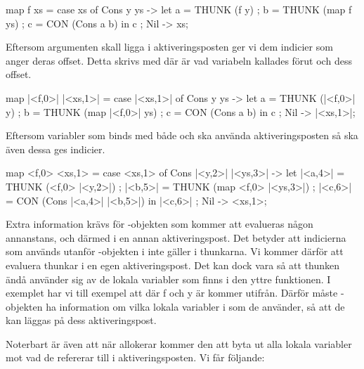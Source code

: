 \documentclass[../Core]{subfiles}
\begin{document}

\begin{codeEx}
map f xs = case xs of
    { Cons y ys -> let
        { a = THUNK (f y)
        ; b = THUNK (map f ys)
        ; c = CON (Cons a b)
        } in c
    ; Nil -> xs};
\end{codeEx}

Eftersom argumenten skall ligga i aktiveringsposten ger vi dem indicier som anger deras 
offset. Detta skrivs med  där  är vad variabeln kallades 
förut och  dess offset.

\begin{codeExDiff}
map |<f,0>| |<xs,1>| = case |<xs,1>| of
    { Cons y ys -> let
        { a = THUNK (|<f,0>| y)
        ; b = THUNK (map |<f,0>| ys)
        ; c = CON (Cons a b)
        } in c
    ; Nil -> |<xs,1>|};
\end{codeExDiff}


Eftersom variabler som binds med både  och  
ska använda aktiveringsposten så ska även dessa ges indicier.

\begin{codeExDiff}
map <f,0> <xs,1> = case <xs,1> of
    { Cons |<y,2>| |<ys,3>| -> let
        { |<a,4>| = THUNK (<f,0> |<y,2>|)
        ; |<b,5>| = THUNK (map <f,0> |<ys,3>|)
        ; |<c,6>| = CON (Cons |<a,4>| |<b,5>|)
        } in |<c,6>|
    ; Nil -> <xs,1>};
\end{codeExDiff}

Extra information krävs för  -objekten som kommer att evalueras någon 
annanstans, och därmed i en annan aktiveringspost. Det betyder att indicierna som 
används utanför -objekten i  inte gäller i thunkarna. Vi kommer därför att evaluera
thunkar i en egen aktiveringspost. Det kan dock vara så att thunken ändå använder sig
av de lokala variabler som finns i den yttre funktionen. I exemplet har vi till exempel att 
 där f och y är kommer utifrån. Därför 
måste -objekten ha information om vilka lokala variabler i  
som de använder, så att de kan läggas på dess aktiveringspost. 

Noterbart är även att när  allokerar kommer den att byta ut alla lokala variabler
mot vad de refererar till i aktiveringsposten. Vi får följande: 

\end{document}
